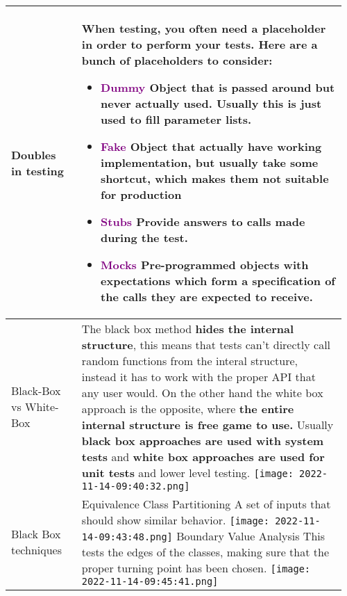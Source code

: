 \documentclass[main.tex,fontsize=8pt,paper=a4,paper=portrait,DIV=calc,]{scrartcl}
\begin{document}
\begin{table}[ht!]
\begin{tabular}{|m{0.2\linewidth}|m{0.755\linewidth}|}
\hline
Doubles in testing & 
When testing, you often need a placeholder in order to perform your tests.\newline
Here are a bunch of placeholders to consider:\newline
\begin{itemize}
\item \textcolor{purple}{Dummy}\newline
  Object that is passed around but never actually used.\newline
  Usually this is just used to fill parameter lists.
\item \textcolor{purple}{Fake}\newline
  Object that actually have working implementation, but usually take some shortcut,\newline
  which makes them not suitable for production
\item \textcolor{purple}{Stubs}\newline
  Provide answers to calls made during the test.
\item \textcolor{purple}{Mocks}\newline
  Pre-programmed objects with expectations which form a specification of the calls they are expected to receive.
\vspace{-3mm}
\end{itemize} \\
\hline
Black-Box vs White-Box & 
The black box method \textbf{hides the internal structure}, this means that tests can't directly call random functions from the interal structure, instead it has to work with the proper API that any user would.\newline
On the other hand the white box approach is the opposite, where \textbf{the entire internal structure is free game to use.}\newline
Usually \textbf{black box approaches are used with system tests} and \textbf{white box approaches are used for unit tests} and lower level testing.\newline
\texttt{[image: 2022-11-14-09:40:32.png]}\\
\hline
Black Box techniques & 
\textcolor{OliveGreen}{Equivalence Class Partitioning}\newline
A set of inputs that should show similar behavior.\newline
\texttt{[image: 2022-11-14-09:43:48.png]}\newline
\textcolor{OliveGreen}{Boundary Value Analysis}\newline
This tests the edges of the classes, making sure that the proper turning point has been chosen.\newline
\texttt{[image: 2022-11-14-09:45:41.png]}\newline


\end{tabular}
\end{table}
\end{document}
